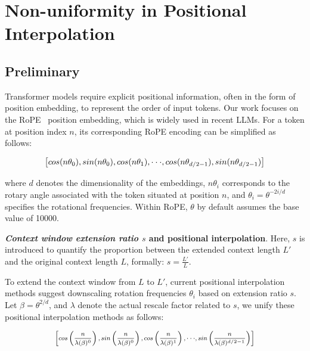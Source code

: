 \section{Non-uniformity in Positional Interpolation}
\label{sec:analysis}

\subsection{Preliminary}

Transformer models require explicit positional information, often in the form of position embedding, to represent the order of input tokens. Our work focuses on the RoPE~\cite{rope} position embedding, which is widely used in recent  LLMs. For a token at position index $n$, its corresponding RoPE encoding can be simplified as follows:

\begin{equation}
		\fontsize{7.8}{7.8} \selectfont
	\label{eq:rope}
	\left[ cos(n\theta_0), sin(n\theta_0), cos(n\theta_1), \cdot\cdot\cdot, cos(n\theta_{d/2-1}), sin(n\theta_{d/2-1}) \right]   
\end{equation}

where $d$ denotes the dimensionality of the embeddings, 
 $n\theta_i$ corresponds to the rotary angle associated with the token situated at position $n$, 
and $\theta_i=\theta^{-2i/d}$ specifies the rotational frequencies. Within RoPE, $\theta$ by default assumes the base value of 10000.

\textbf{\emph{Context window extension ratio $s$} and positional interpolation}. Here, $s$ is introduced to quantify the proportion between the extended context length $L'$ and the original context length $L$, formally: $s=\frac{L'}{L}$.

To extend the context window from $L$ to $L'$, current positional interpolation methods suggest downscaling rotation frequencies $\theta_i$ based on extension ratio $s$. Let $\beta=\theta^{2/d}$, and $\lambda$ denote the actual rescale factor related to $s$, we   unify these positional interpolation methods as follows:

\begin{equation}	
	\fontsize{7.5}{7.5} \selectfont
	\label{eq:unified_rope}
	\begin{aligned}
		\left[cos\left(\frac{n}{\lambda(\beta)^0}\right), sin \left(\frac{n}{\lambda(\beta)^0}\right), cos\left(\frac{n}{\lambda(\beta)^1}\right), \cdot\cdot\cdot,  sin \left(\frac{n}{\lambda(\beta)^{d/2-1}}\right) \right]   
	\end{aligned}
\end{equation}


